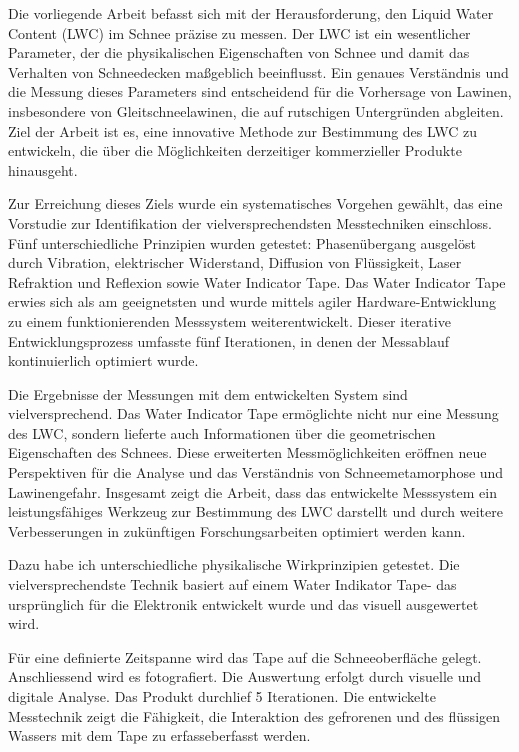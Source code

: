 Die vorliegende Arbeit befasst sich mit der Herausforderung, den Liquid Water Content (LWC) im Schnee präzise zu messen. Der LWC ist ein wesentlicher Parameter, der die physikalischen Eigenschaften von Schnee und damit das Verhalten von Schneedecken maßgeblich beeinflusst. Ein genaues Verständnis und die Messung dieses Parameters sind entscheidend für die Vorhersage von Lawinen, insbesondere von Gleitschneelawinen, die auf rutschigen Untergründen abgleiten. Ziel der Arbeit ist es, eine innovative Methode zur Bestimmung des LWC zu entwickeln, die über die Möglichkeiten derzeitiger kommerzieller Produkte hinausgeht.

Zur Erreichung dieses Ziels wurde ein systematisches Vorgehen gewählt, das eine Vorstudie zur Identifikation der vielversprechendsten Messtechniken einschloss. Fünf unterschiedliche Prinzipien wurden getestet: Phasenübergang ausgelöst durch Vibration, elektrischer Widerstand, Diffusion von Flüssigkeit, Laser Refraktion und Reflexion sowie Water Indicator Tape. Das Water Indicator Tape erwies sich als am geeignetsten und wurde mittels agiler Hardware-Entwicklung zu einem funktionierenden Messsystem weiterentwickelt. Dieser iterative Entwicklungsprozess umfasste fünf Iterationen, in denen der Messablauf kontinuierlich optimiert wurde.

Die Ergebnisse der Messungen mit dem entwickelten System sind vielversprechend. Das Water Indicator Tape ermöglichte nicht nur eine Messung des LWC, sondern lieferte auch Informationen über die geometrischen Eigenschaften des Schnees. Diese erweiterten Messmöglichkeiten eröffnen neue Perspektiven für die Analyse und das Verständnis von Schneemetamorphose und Lawinengefahr. Insgesamt zeigt die Arbeit, dass das entwickelte Messsystem ein leistungsfähiges Werkzeug zur Bestimmung des LWC darstellt und durch weitere Verbesserungen in zukünftigen Forschungsarbeiten optimiert werden kann.

\iffalse

Dazu habe ich unterschiedliche  physikalische Wirkprinzipien getestet. 
Die vielversprechendste Technik basiert auf einem Water Indikator Tape- das ursprünglich für die Elektronik entwickelt wurde und  das visuell ausgewertet wird.

 Für eine definierte Zeitspanne wird das Tape auf die Schneeoberfläche gelegt. Anschliessend wird es fotografiert. Die Auswertung erfolgt durch visuelle und digitale Analyse.
Das Produkt durchlief 5 Iterationen. Die entwickelte Messtechnik zeigt die Fähigkeit, die Interaktion des gefrorenen und des flüssigen Wassers mit dem Tape zu erfasseberfasst werden.

